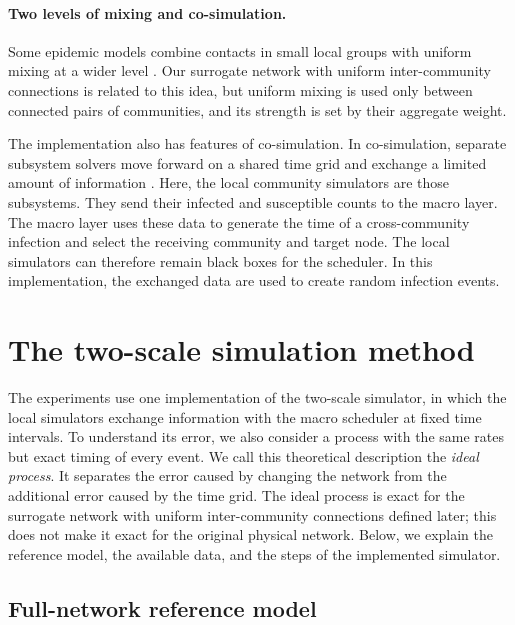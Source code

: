 \documentclass{ieeeaccess}
\begin{document}
\paragraph{Two levels of mixing and co-simulation.}
Some epidemic models combine contacts in small local groups with uniform mixing at a wider level \cite{ball1997}. Our surrogate network with uniform inter-community connections is related to this idea, but uniform mixing is used only between connected pairs of communities, and its strength is set by their aggregate weight.

The implementation also has features of co-simulation. In co-simulation, separate subsystem solvers move forward on a shared time grid and exchange a limited amount of information \cite{gomes2018cosim}. Here, the local community simulators are those subsystems. They send their infected and susceptible counts to the macro layer. The macro layer uses these data to generate the time of a cross-community infection and select the receiving community and target node. The local simulators can therefore remain black boxes for the scheduler. In this implementation, the exchanged data are used to create random infection events.

\section{The two-scale simulation method}
\label{sec:method}

The experiments use one implementation of the two-scale simulator, in which the local simulators exchange information with the macro scheduler at fixed time intervals. To understand its error, we also consider a process with the same rates but exact timing of every event. We call this theoretical description the \emph{ideal process}. It separates the error caused by changing the network from the additional error caused by the time grid. The ideal process is exact for the surrogate network with uniform inter-community connections defined later; this does not make it exact for the original physical network. Below, we explain the reference model, the available data, and the steps of the implemented simulator.

\subsection{Full-network reference model}
\label{sec:reference}
\end{document}
